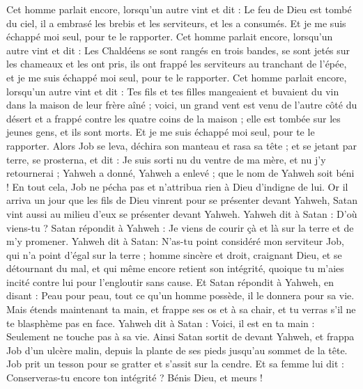 \begin{multicols}{2}
Cet homme parlait encore, lorsqu'un autre vint et dit : Le feu de Dieu est tombé du ciel, il a embrasé les brebis et les serviteurs, et les a consumés. Et je me suis échappé moi seul, pour te le rapporter.
Cet homme parlait encore, lorsqu'un autre vint et dit : Les Chaldéens se sont rangés en trois bandes, se sont jetés sur les chameaux et les ont pris, ils ont frappé les serviteurs au tranchant de l'épée, et je me suis échappé moi seul, pour te le rapporter.
Cet homme parlait encore, lorsqu'un autre vint et dit : Tes fils et tes filles mangeaient et buvaient du vin dans la maison de leur frère aîné ;
voici, un grand vent est venu de l'autre côté du désert et a frappé contre les quatre coins de la maison ; elle est tombée sur les jeunes gens, et ils sont morts. Et je me suis échappé moi seul, pour te le rapporter.
Alors Job se leva, déchira son manteau et rasa sa tête ; et se jetant par terre, se prosterna,
et dit : Je suis sorti nu du ventre de ma mère, et nu j'y retournerai ; Yahweh a donné, Yahweh a enlevé ; que le nom de Yahweh soit béni !
En tout cela, Job ne pécha pas et n'attribua rien à Dieu d'indigne de lui.
\VerseOne{}Or il arriva un jour que les fils de Dieu vinrent pour se présenter devant Yahweh, Satan vint aussi au milieu d'eux se présenter devant Yahweh.
Yahweh dit à Satan : D'où viens-tu ? Satan répondit à Yahweh : Je viens de courir çà et là sur la terre et de m'y promener.
Yahweh dit à Satan: N'as-tu point considéré mon serviteur Job, qui n'a point d'égal sur la terre ; homme sincère et droit, craignant Dieu, et se détournant du mal, et qui même encore retient son intégrité, quoique tu m'aies incité contre lui pour l'engloutir sans cause.
Et Satan répondit à Yahweh, en disant : Peau pour peau, tout ce qu'un homme possède, il le donnera pour sa vie.
Mais étends maintenant ta main, et frappe ses os et à sa chair, et tu verras s'il ne te blasphème pas en face. 
Yahweh dit à Satan : Voici, il est en ta main : Seulement ne touche pas à sa vie.
Ainsi Satan sortit de devant Yahweh, et frappa Job d'un ulcère malin, depuis la plante de ses pieds jusqu'au sommet de la tête.
Job prit un tesson pour se gratter et s'assit sur la cendre.
Et sa femme lui dit : Conserveras-tu encore ton intégrité ? Bénis Dieu, et meurs !

\end{multicols}
